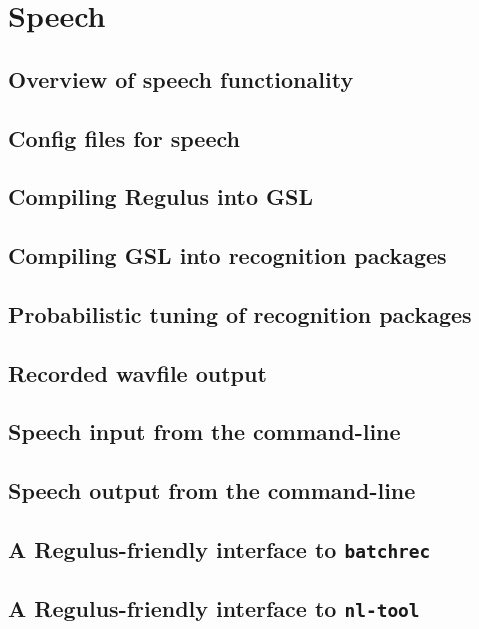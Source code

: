 \chapter{Speech}
\label{Chapter:Speech}

\author{Manny Rayner}

\section{Overview of speech functionality}
\label{Section:SpeechOverview}

\section{Config files for speech}
\label{Section:SpeechConfig}

\section{Compiling Regulus into GSL}
\label{Section:UGToGSL}

\section{Compiling GSL into recognition packages}
\label{Section:GSLToNuance}

\section{Probabilistic tuning of recognition packages}
\label{Section:PCFG}

\section{Recorded wavfile output}
\label{Section:RecordedWavfiles}

\section{Speech input from the command-line}
\label{Section:SpeechInput}

\section{Speech output from the command-line}
\label{Section:SpeechOutput}

\section{A Regulus-friendly interface to {\tt batchrec}}
\label{Section:Batchrec}

\section{A Regulus-friendly interface to {\tt nl-tool}}
\label{Section:NLTool}
